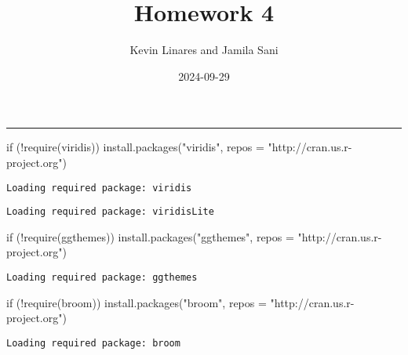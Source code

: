 \documentclass[
  letterpaper,
  DIV=11,
  numbers=noendperiod]{scrartcl}
\title{Homework 4}
\author{Kevin Linares and Jamila Sani}
\date{2024-09-29}
\newenvironment{Shaded}{\begin{snugshade}}{\end{snugshade}}
\newcommand{\AttributeTok}[1]{\textcolor[rgb]{0.40,0.45,0.13}{#1}}
\newcommand{\ControlFlowTok}[1]{\textcolor[rgb]{0.00,0.23,0.31}{#1}}
\newcommand{\FunctionTok}[1]{\textcolor[rgb]{0.28,0.35,0.67}{#1}}
\newcommand{\NormalTok}[1]{\textcolor[rgb]{0.00,0.23,0.31}{#1}}
\newcommand{\SpecialCharTok}[1]{\textcolor[rgb]{0.37,0.37,0.37}{#1}}
\newcommand{\StringTok}[1]{\textcolor[rgb]{0.13,0.47,0.30}{#1}}
\begin{document}
\maketitle

\begin{center}\rule{0.5\linewidth}{0.5pt}\end{center}

\begin{Shaded}
\begin{Highlighting}[]
\ControlFlowTok{if}\NormalTok{ (}\SpecialCharTok{!}\FunctionTok{require}\NormalTok{(viridis)) }\FunctionTok{install.packages}\NormalTok{(}\StringTok{"viridis"}\NormalTok{, }\AttributeTok{repos =} \StringTok{"http://cran.us.r{-}project.org"}\NormalTok{)}
\end{Highlighting}
\end{Shaded}

\begin{verbatim}
Loading required package: viridis
\end{verbatim}

\begin{verbatim}
Loading required package: viridisLite
\end{verbatim}

\begin{Shaded}
\begin{Highlighting}[]
\ControlFlowTok{if}\NormalTok{ (}\SpecialCharTok{!}\FunctionTok{require}\NormalTok{(ggthemes)) }\FunctionTok{install.packages}\NormalTok{(}\StringTok{"ggthemes"}\NormalTok{, }\AttributeTok{repos =} \StringTok{"http://cran.us.r{-}project.org"}\NormalTok{)}
\end{Highlighting}
\end{Shaded}

\begin{verbatim}
Loading required package: ggthemes
\end{verbatim}

\begin{Shaded}
\begin{Highlighting}[]
\ControlFlowTok{if}\NormalTok{ (}\SpecialCharTok{!}\FunctionTok{require}\NormalTok{(broom)) }\FunctionTok{install.packages}\NormalTok{(}\StringTok{"broom"}\NormalTok{, }\AttributeTok{repos =} \StringTok{"http://cran.us.r{-}project.org"}\NormalTok{)}
\end{Highlighting}
\end{Shaded}

\begin{verbatim}
Loading required package: broom
\end{verbatim}
\end{document}
